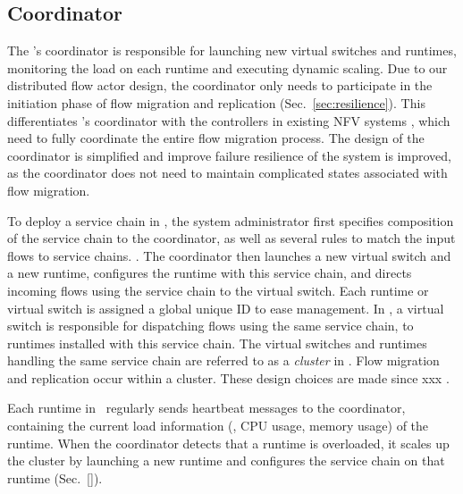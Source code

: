 \subsection{Coordinator}
\label{sec:coordinator}

The \nfactor's coordinator is responsible for launching new virtual switches and runtimes, monitoring the load on each runtime and executing dynamic scaling. Due to our distributed flow actor design, the coordinator only needs to participate in the initiation phase of flow migration and replication (Sec.~\ref{sec:resilience}). This differentiates \nfactor's coordinator with the controllers in existing NFV systems \cite{gember2015opennf}\cite{rajagopalan2013split}, which need to fully coordinate the entire flow migration process.
The design of the coordinator is simplified and improve failure resilience of the system is improved, as the coordinator does not need to maintain complicated states associated with flow migration.

To deploy a service chain in \nfactor, the system administrator first specifies composition of the service chain to the coordinator, as well as several rules to match the input flows to service chains. . The coordinator then launches a new virtual switch and a new runtime, configures the runtime with this service chain, and directs incoming flows using the service chain to the virtual switch. Each runtime or virtual switch is assigned a global unique ID to ease management.  In \nfactor, a virtual switch is responsible for dispatching flows using the same service chain, to runtimes installed with this service chain. The virtual switches and runtimes handling the same service chain are referred to as a {\em cluster} in \nfactor. Flow migration and replication occur within a cluster. These design choices are made since xxx .


Each runtime in \nfactor~regularly sends heartbeat messages to the coordinator, containing the current load information (\ie, CPU usage, memory usage) of the runtime. When the coordinator detects that a runtime is overloaded, it scales up the cluster by launching a new runtime and configures the service chain on that runtime (Sec.~\ref{}). 


